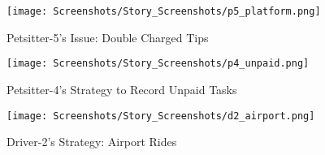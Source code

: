 \begin{figure}[H]
        \texttt{[image: Screenshots/Story\_Screenshots/p5\_platform.png]}
    \caption{Petsitter-5's Issue: Double Charged Tips}
    \label{p5_platform}
\end{figure}
\begin{figure}[H]
        \texttt{[image: Screenshots/Story\_Screenshots/p4\_unpaid.png]}
    \caption{Petsitter-4's Strategy to Record Unpaid Tasks}
    \label{p4_unpaid}
\end{figure}
\begin{figure}[H]
    \texttt{[image: Screenshots/Story\_Screenshots/d2\_airport.png]}
    \caption{Driver-2's Strategy: Airport Rides}
    \label{d2_airport}
\end{figure}